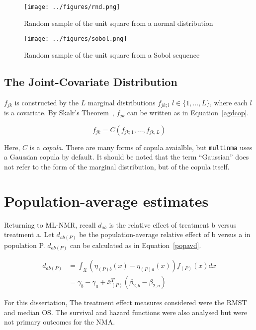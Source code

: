 \begin{figure}
    \centering
    \texttt{[image: ../figures/rnd.png]}
    \caption{Random sample of the unit square from a normal distribution}
    \label{rndPlot}
\end{figure}

\begin{figure}
    \centering
    \texttt{[image: ../figures/sobol.png]}
    \caption{Random sample of the unit square from a Sobol sequence}
    \label{sblPlot}
\end{figure}

\subsection{The Joint-Covariate Distribution}
$f_{jk}$ is constructed by the $L$ marginal distributions $f_{jk;l}$ $l \in \{1,\ldots,L\}$, where each $l$ is a covariate. By Skalr's Theorem~\cite{sklar1959}, $f_{jk}$ can be written as in Equation~\ref{agdcop}. 

\begin{equation}
    f_{jk} = C(f_{jk;1},\ldots,f_{jk,L})
    \label{agdcop}
\end{equation}

Here, $C$ is a \textit{copula}. There are many forms of copula avaialble, but \verb|multinma| uses a Gaussian copula by default. It should be noted that the term ``Gaussian'' does not refer to the form of the marginal distribution, but of the copula itself. 

\section{Population-average estimates}
Returning to ML-NMR, recall $d_{ab}$ is the relative effect of treatment b versus treatment a. Let $d_{ab(P)}$ be the population-average relative effect of b versus a in population P. $d_{ab(P)}$ can be calculated as in Equation~\ref{popavd}. 

\begin{align}
    d_{ab(P)} &= \int_{\mathfrak{X}}(\eta_{(P)b}(x) - \eta_{(P)a}(x))f_{(P)}(x)dx \label{popavgdInt} \\
              &= \gamma_b - \gamma_a + \bar{x}^T_{(P)}(\beta_{2,b}-\beta_{2,a}) \label{popavd}
\end{align}

For this dissertation, The treatment effect measures considered were the RMST and median OS. The survival and hazard functions were also analysed but were not primary outcomes for the NMA.

